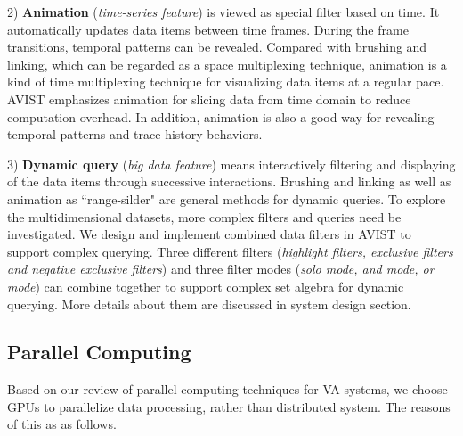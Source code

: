 2) \textbf{Animation} (\textit{time-series feature}) is viewed as special filter based on time. 
It automatically updates data items between time frames. During the frame transitions, temporal patterns can be revealed. 
Compared with brushing and linking, which can be regarded as a space multiplexing technique, animation is a kind of  time multiplexing technique for visualizing data items at a regular pace.  AVIST  emphasizes animation for slicing data from time domain to reduce computation overhead. In addition, animation is also a good way for revealing temporal  patterns and trace history behaviors. 

3) \textbf{Dynamic query} (\textit{big data feature}) means interactively filtering and displaying of the data items through successive interactions. Brushing and linking as well as animation as ``range-silder" are  general methods for dynamic queries. To explore the multidimensional datasets, more complex filters and queries need be investigated. We design and implement combined data filters in AVIST to support complex querying. Three different filters (\textit{highlight filters, exclusive filters and negative exclusive filters}) and three filter modes (\textit{solo mode, and mode, or mode}) can combine together to support complex set algebra for dynamic querying. More details about them are discussed in system design section.



\subsection{Parallel Computing}

Based on our review of parallel computing techniques for VA systems, we choose GPUs to parallelize data processing, rather than distributed system. The reasons of this as as follows.

